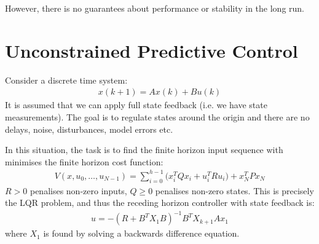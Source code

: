 \documentclass[a4paper]{article}
\newcommand{\ix}[1]{%
  \leavevmode %
  \marginpar{\small\emph{#1}}%
}
\begin{document}
However, there is no guarantees about performance or stability in the long run. 

\section{Unconstrained Predictive Control}
Consider a discrete time system:
\begin{align}
x(k+1) = Ax(k) + Bu(k)
\end{align}
\ix{Assumptions}It is assumed that we can apply full state feedback (i.e. we have state measurements). The goal is to regulate states around the origin and there are no delays, noise, disturbances, model errors etc. 

\ix{Task}In this situation, the task is to find the finite horizon input sequence with minimises the finite horizon cost function:
\begin{align}
V(x, u_0, \ldots, u_{N-1}) = \sum_{i=0}^{h-1} \Big( x_i^T Q x_i + u_i^T R u_i \Big) + x_N^T P x_N
\end{align}
$R > 0$ penalises non-zero inputs, $Q \geq 0$ penalises non-zero states. This is precisely the LQR problem, and thus the receding horizon controller with state feedback is:
\begin{align}
u = -(R + B^T X_{1} B)^{-1} B^T X_{k+1} A x_1
\end{align}
where $X_1$ is found by solving a backwards difference equation. 
\end{document}

